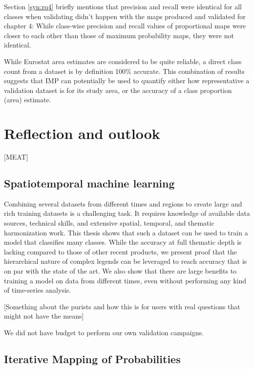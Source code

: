         Section \ref{syn:rq4} briefly mentions that precision and recall were identical for all classes when validating didn't happen with the maps produced and validated for chapter 4: While class-wise precision and recall values of proportional maps were closer to each other than those of maximum probability maps, they were not identical.
    
        While Eurostat area estimates are considered to be quite reliable, a direct class count from a dataset is by definition 100\% accurate. This combination of results suggests that IMP can potentially be used to quantify either how representative a validation dataset is for its study area, or the accuracy of a class proportion (area) estimate. 


\section{Reflection and outlook}

    [MEAT]

    \subsection{Spatiotemporal machine learning}

        Combining several datasets from different times and regions to create large and rich training datasets is a challenging task. It requires knowledge of available data sources, technical skills, and extensive spatial, temporal, and thematic harmonization work. This thesis shows that such a dataset can be used to train a model that classifies many classes. While the accuracy at full thematic depth is lacking compared to those of other recent products, we present proof that the hierarchical nature of complex legends can be leveraged to reach accuracy that is on par with the state of the art. We also show that there are large benefits to training a model on data from different times, even without performing any kind of time-series analysis.

        [Something about the purists and how this is for users with real questions that might not have the means]

        We did not have budget to perform our own validation campaigns.
    
    \subsection{Iterative Mapping of Probabilities}

